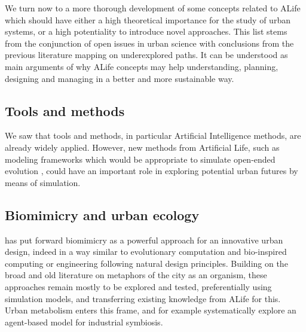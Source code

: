 \documentclass[10pt]{article}
\begin{document}
We turn now to a more thorough development of some concepts related to ALife which should have either a high theoretical importance for the study of urban systems, or a high potentiality to introduce novel approaches. This list stems from the conjunction of open issues in urban science \citep{lobo2020urban} with conclusions from the previous literature mapping on underexplored paths. It can be understood as main arguments of why ALife concepts may help understanding, planning, designing and managing in a better and more sustainable way.






\subsection{Tools and methods}


We saw that tools and methods, in particular Artificial Intelligence methods, are already widely applied. However, new methods from Artificial Life, such as modeling frameworks which would be appropriate to simulate open-ended evolution \citep{banzhaf2016defining}, could have an important role in exploring potential urban futures by means of simulation.

\subsection{Biomimicry and urban ecology}


\cite{taylor2017art} has put forward biomimicry as a powerful approach for an innovative urban design, indeed in a way similar to evolutionary computation and bio-inspired computing or engineering following natural design principles. Building on the broad and old literature on metaphors of the city as an organism, these approaches remain mostly to be explored and tested, preferentially using simulation models, and transferring existing knowledge from ALife for this. Urban metabolism enters this frame, and \cite{raimbault2020spatial} for example systematically explore an agent-based model for industrial symbiosis.
\end{document}

